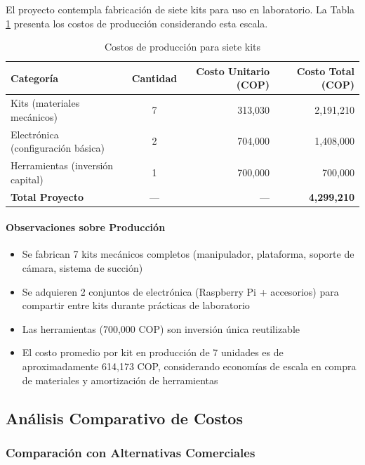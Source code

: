 El proyecto contempla fabricación de siete kits para uso en laboratorio. La Tabla \ref{tab:produccion_multiple} presenta los costos de producción considerando esta escala.

\begin{table}[H]
\centering
\caption{Costos de producción para siete kits}
\label{tab:produccion_multiple}
\small
\begin{tabular}{|l|c|r|r|}
\hline
\textbf{Categoría} & \textbf{Cantidad} & \textbf{Costo Unitario (COP)} & \textbf{Costo Total (COP)} \\
\hline
Kits (materiales mecánicos) & 7 & 313,030 & 2,191,210 \\
Electrónica (configuración básica) & 2 & 704,000 & 1,408,000 \\
Herramientas (inversión capital) & 1 & 700,000 & 700,000 \\
\hline
\textbf{Total Proyecto} & --- & --- & \textbf{4,299,210} \\
\hline
\end{tabular}
\end{table}

\paragraph{Observaciones sobre Producción}

\begin{itemize}
    \item Se fabrican 7 kits mecánicos completos (manipulador, plataforma, soporte de cámara, sistema de succión)
    \item Se adquieren 2 conjuntos de electrónica (Raspberry Pi + accesorios) para compartir entre kits durante prácticas de laboratorio
    \item Las herramientas (700,000 COP) son inversión única reutilizable
    \item El costo promedio por kit en producción de 7 unidades es de aproximadamente 614,173 COP, considerando economías de escala en compra de materiales y amortización de herramientas
\end{itemize}
\subsection{Análisis Comparativo de Costos}

\subsubsection{Comparación con Alternativas Comerciales}

